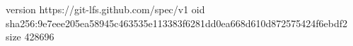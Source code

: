 version https://git-lfs.github.com/spec/v1
oid sha256:9e7eee205ea58945c463535e113383f6281dd0ea668d610d872575424f6ebdf2
size 428696
